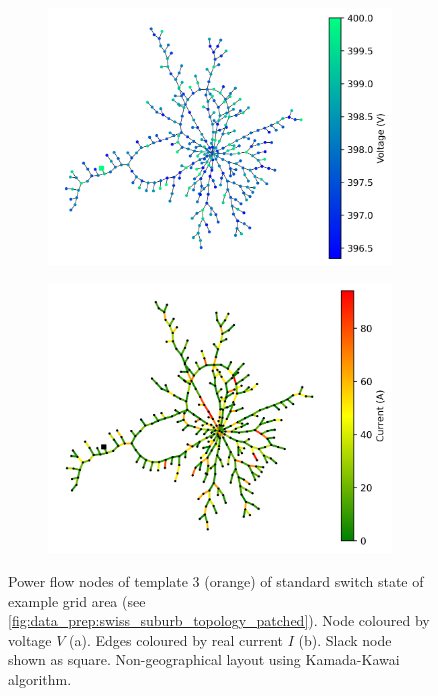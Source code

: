 \begin{figure}[H]
    \begin{subfigure}{.5\textwidth}
        \centering
        \includegraphics[width=\linewidth]{img/switchstate_exploring/swiss_suburb/pf_island_voltage.png}
        \caption{}
        \label{fig:pf:results_voltage}
      \end{subfigure}%
      \begin{subfigure}{.5\textwidth}
        \centering
        \includegraphics[width=\linewidth]{img/switchstate_exploring/swiss_suburb/pf_island_currents.png}
        \caption{}
        \label{fig:pf:results_currents}
      \end{subfigure}
    \caption{
        Power flow nodes of template 3 (orange) of standard switch state
        of example grid area (see \autoref{fig:data_prep:swiss_suburb_topology_patched}).
        Node coloured by voltage $V$ (a). Edges coloured by real current $I$ (b).
        Slack node shown as square. Non-geographical layout using
        Kamada-Kawai algorithm\autocite{kamada_kawai}.
    }
\end{figure}


